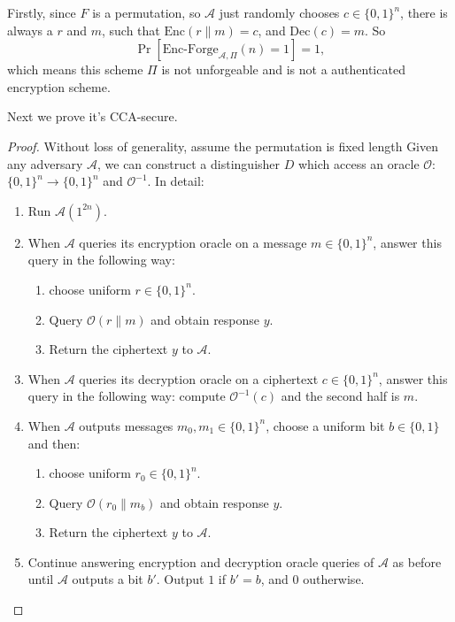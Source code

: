 \documentclass[12pt]{article}
\newcommand{\Enc}{\text{Enc}}
\newcommand{\Dec}{\text{Dec}}
\newcommand{\A}{\mathcal{A}}
\newcommand{\OO}{\mathcal{O}}
\newenvironment{problem}[2][Problem]{\begin{trivlist}
\item[\hskip \labelsep {\bfseries #1}\hskip \labelsep {\bfseries #2.}]}{\end{trivlist}}
\begin{document}
\begin{problem}{4.25}
Firstly, since $F$ is a permutation, so $\A$ just randomly chooses $c\in\{0,1\}^{n}$, there is always a $r$ and $m$, such that $\Enc(r\|m)=c$, and $\Dec(c)=m$. So
\[\Pr[\Enc\text{-Forge}_{\A,\Pi}(n)=1]=1, \]
which means this scheme $\Pi$ is not unforgeable and is not a authenticated encryption scheme.\par\vspace{2ex}
Next we prove it's CCA-secure.\par

\begin{proof}
Without loss of generality, assume the permutation is fixed length 
Given any adversary $\A$, we can construct a distinguisher $D$ which access an oracle $\OO$:$\{0,1\}^{n}\rightarrow\{0,1\}^{n}$ and $\OO^{-1}$. In detail:
\begin{enumerate}
    \item Run $\A(1^{2n})$. 
    \item When $\A$ queries its encryption oracle on a message $m\in \{0,1\}^{n}$, answer this query in the following way:
    \begin{enumerate}
        \item choose uniform $r\in\{0,1\}^n$.
        \item Query $\OO(r\|m)$ and obtain response $y$.
        \item Return the ciphertext $y$ to $\A$.
    \end{enumerate}
    \item When $\A$ queries its decryption oracle on a ciphertext $c\in \{0,1\}^{n}$, answer this query in the following way: compute $\OO^{-1}(c)$ and the second half is $m$. 
    \item When $\A$ outputs messages $m_0,m_1\in\{0,1\}^n$, choose a uniform bit $b\in\{0,1\}$ and then:
    \begin{enumerate}
        \item choose uniform $r_0\in\{0,1\}^n$.
        \item Query $\OO(r_0\|m_b)$ and obtain response $y$.
        \item Return the ciphertext $y$ to $\A$.
    \end{enumerate}
    \item Continue answering encryption and decryption oracle queries of $\A$ as before until $\A$ outputs a bit $b'$. Output $1$ if $b'=b$, and $0$ outherwise.
\end{enumerate}


\end{proof}
\end{problem}
\end{document}
